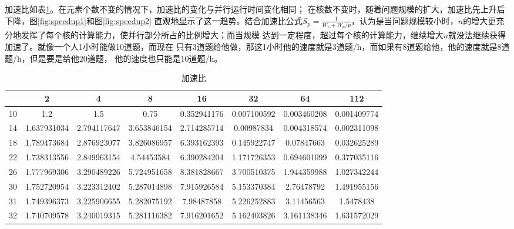 \documentclass[10pt,letterpaper]{ctexart}
\newcommand{\figref}[1]{图\ref{#1}}
\newcommand{\tabref}[1]{表\ref{#1}}
\begin{document}
\par 加速比如\tabref{tab:speedup}。在元素个数不变的情况下，加速比的变化与并行运行时间变化相同；
在核数不变时，随着问题规模的扩大，加速比先上升后下降，\figref{fig:speedup1}和\figref{fig:speedup2}
直观地显示了这一趋势。结合加速比公式$S_p = \frac{1}{W_s+W_p / p}$，认为是当问题规模较小时，$n$的增大更充分地发挥了每个核的计算能力，使并行部分所占的比例增大；而当规模
达到一定程度，超过每个核的计算能力，继续增大$n$就没法继续获得加速了。就像一个人1小时能做10道题，而现在
只有3道题给他做，那这1小时他的速度就是3道题/h，而如果有8道题给他，他的速度就是8道题/h，但是要是给他20道题，
他的速度也只能是10道题/h。
\begin{table}[!htbp]
    \centering
    \begin{tabular}{c|ccccccc}
        \toprule
        & 2 & 4 & 8 & 16 & 32 & 64 & 112\\
        \hline
        10 & 1.2 & 1.5 & 0.75 & 0.352941176 & 0.007100592 & 0.003460208 & 0.001409774\\
        14 & 1.637931034 & 2.794117647 & 3.653846154 & 2.714285714 & 0.00987834 & 0.004318574 & 0.002311098\\
        18 & 1.789473684 & 2.876923077 & 3.826086957 & 6.393162393 & 0.145922747 & 0.07847663 & 0.032625289\\
        22 & 1.738313556 & 2.849963154 & 4.54453584 & 6.390284204 & 1.171726353 & 0.694601099 & 0.377035116\\
        26 & 1.777969306 & 3.290489226 & 5.724951658 & 8.381828667 & 3.700510375 & 1.944359988 & 1.027342244\\
        30 & 1.752720954 & 3.223312402 & 5.287014898 & 7.915926584 & 5.153370384 & 2.76478792 & 1.491955156\\
        31 & 1.749396373 & 3.225906655 & 5.282075192 & 7.98487858 & 5.226252883 & 3.11456563 & 1.5478438\\
        32 & 1.740709578 & 3.240019315 & 5.281116382 & 7.916201652 & 5.162403826 & 3.161138346 & 1.631572029        \\
        \bottomrule
    \end{tabular}
    \caption{加速比} \label{tab:speedup}
\end{table}

\begin{figure}[H]
    \centering
\end{figure}
\end{document}

